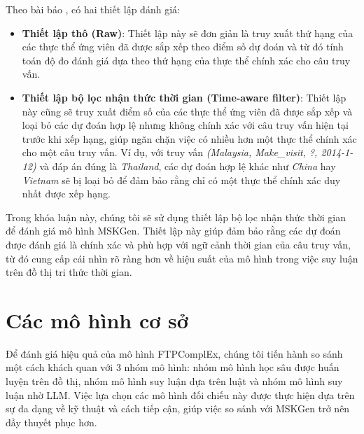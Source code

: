 Theo bài báo \cite{ref_article45}, có hai thiết lập đánh giá:
\begin{itemize}
    \item \textbf{Thiết lập thô (Raw)}: Thiết lập này sẽ đơn giản là truy xuất thứ hạng của các thực thể ứng viên đã được sắp xếp theo điểm số
    dự đoán và từ đó tính toán độ đo đánh giá dựa theo thứ hạng của thực thể chính xác cho câu truy vấn. 
    \item \textbf{Thiết lập bộ lọc nhận thức thời gian (Time-aware filter)}: Thiết lập này cũng sẽ truy xuất điểm số của các thực thể ứng viên đã được sắp xếp 
    và loại bỏ các dự đoán hợp lệ nhưng không chính xác với câu truy vấn hiện tại trước khi xếp hạng, giúp ngăn chặn việc có nhiều hơn một thực thể chính xác cho một câu truy vấn.
    Ví dụ, với truy vấn \textit{(Malaysia, Make\_visit, ?, 2014-1-12)} và đáp án đúng là \textit{Thailand}, các dự đoán hợp lệ khác như 
    \textit{China} hay \textit{Vietnam} sẽ bị loại bỏ để đảm bảo rằng chỉ có một thực thể chính xác duy nhất được xếp hạng.
\end{itemize}

Trong khóa luận này, chúng tôi sẽ sử dụng thiết lập bộ lọc nhận thức thời gian để đánh giá mô hình MSKGen. Thiết lập này giúp đảm bảo rằng các dự đoán được đánh giá là chính xác và phù hợp với ngữ cảnh thời gian của câu truy vấn, từ đó cung cấp cái nhìn rõ ràng hơn về hiệu suất của mô hình trong việc suy luận trên đồ thị tri thức thời gian.
\section{Các mô hình cơ sở}
Để đánh giá hiệu quả của mô hình FTPComplEx, chúng tôi tiến hành so sánh một cách khách quan với 3 nhóm mô hình: nhóm mô hình học sâu được huấn luyện trên đồ thị, nhóm mô hình suy luận dựa trên luật và nhóm mô hình suy luận nhờ LLM. Việc lựa chọn các mô hình đối chiếu này được thực hiện dựa trên sự đa dạng về kỹ thuật và cách tiếp cận, giúp việc so sánh với MSKGen trở nên đầy thuyết phục hơn. 

